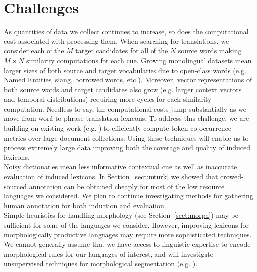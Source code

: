 \documentclass{article}
\newcommand{\secref}[1]{Section~\ref{#1}}
\begin{document}


\section{Challenges}

As quantities of data we collect continues to increase, so does the computational cost associated with processing them.  When searching for translations, we consider each of the $M$ target candidates for all of the $N$ source words making $M \times N$ similarity computations for each cue.  Growing monolingual datasets mean larger sizes of both source and target vocabularies due to open-class words (e.g. Named Entities, slang, borrowed words, etc.).  Moreover, vector representations of both source words and target candidates also grow (e.g. larger context vectors and temporal distributions) requiring more cycles for each similarity computation.  Needless to say, the computational costs jump substantially as we move from word to phrase translation lexicons.  To address this challenge, we are building on existing work  (e.g. \cite{LiChurchHastieNIPS08,Li:2010,VanDurmeLallIJCAI09,VanDurmeLallNIPS09,VanDurmeLallACL10}) to efficiently compute token co-occurrence metrics over large document collections. Using these techniques will enable us to process extremely large data improving both the coverage and quality of induced lexicons.\\

Noisy dictionaries mean less informative contextual cue as well as inaccurate evaluation of induced lexicons. In \secref{sect:mturk} we showed that crowed-sourced annotation can be obtained cheaply for most of the low resource languages we considered.  We plan to continue investigating methods for gathering human annotation for both induction and evaluation.\\

Simple heuristics for handling morphology (see \secref{sect:morph}) may be sufficient for some of the languages we consider.  However, improving lexicons for morphologically productive languages may require more sophisticated techniques.  We cannot generally assume that we have access to linguistic expertise to encode morphological rules for our languages of interest, and will investigate unsupervised techniques for morphological segmentation (e.g. \cite{Snyder:2008, Poon:2009a}).\\
\end{document}
